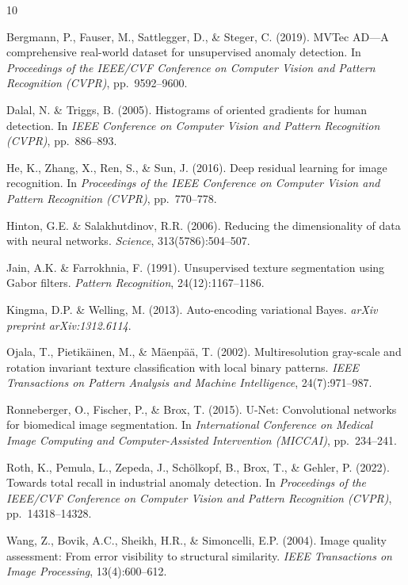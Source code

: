 \documentclass{article}
\begin{document}

{\small
\begin{thebibliography}{10}

Bergmann, P., Fauser, M., Sattlegger, D., \& Steger, C. (2019).
MVTec AD---A comprehensive real-world dataset for unsupervised anomaly detection.
In \textit{Proceedings of the IEEE/CVF Conference on Computer Vision and Pattern Recognition (CVPR)}, pp.~9592--9600.

Dalal, N. \& Triggs, B. (2005).
Histograms of oriented gradients for human detection.
In \textit{IEEE Conference on Computer Vision and Pattern Recognition (CVPR)}, pp.~886--893.

He, K., Zhang, X., Ren, S., \& Sun, J. (2016).
Deep residual learning for image recognition.
In \textit{Proceedings of the IEEE Conference on Computer Vision and Pattern Recognition (CVPR)}, pp.~770--778.

Hinton, G.E. \& Salakhutdinov, R.R. (2006).
Reducing the dimensionality of data with neural networks.
\textit{Science}, 313(5786):504--507.

Jain, A.K. \& Farrokhnia, F. (1991).
Unsupervised texture segmentation using Gabor filters.
\textit{Pattern Recognition}, 24(12):1167--1186.

Kingma, D.P. \& Welling, M. (2013).
Auto-encoding variational Bayes.
\textit{arXiv preprint arXiv:1312.6114}.

Ojala, T., Pietik{\"a}inen, M., \& M{\"a}enp{\"a}{\"a}, T. (2002).
Multiresolution gray-scale and rotation invariant texture classification with local binary patterns.
\textit{IEEE Transactions on Pattern Analysis and Machine Intelligence}, 24(7):971--987.

Ronneberger, O., Fischer, P., \& Brox, T. (2015).
U-Net: Convolutional networks for biomedical image segmentation.
In \textit{International Conference on Medical Image Computing and Computer-Assisted Intervention (MICCAI)}, pp.~234--241.

Roth, K., Pemula, L., Zepeda, J., Sch{\"o}lkopf, B., Brox, T., \& Gehler, P. (2022).
Towards total recall in industrial anomaly detection.
In \textit{Proceedings of the IEEE/CVF Conference on Computer Vision and Pattern Recognition (CVPR)}, pp.~14318--14328.

Wang, Z., Bovik, A.C., Sheikh, H.R., \& Simoncelli, E.P. (2004).
Image quality assessment: From error visibility to structural similarity.
\textit{IEEE Transactions on Image Processing}, 13(4):600--612.

\end{thebibliography}
}
\end{document}
